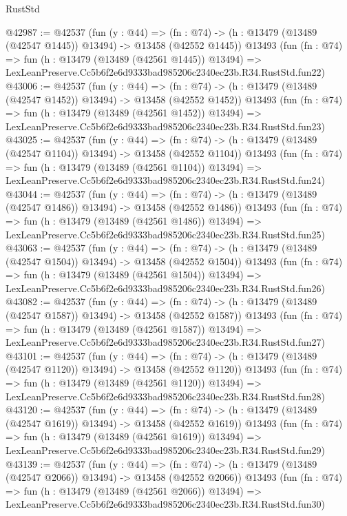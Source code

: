 \begin{lexlean}{RustStd}
\begin{coremodule}
@42987 := @42537
    (fun (y : @44) =>
    (fn : @74) -> (h : @13479 (@13489 (@42547 @1445)) @13494) -> @13458 (@42552 @1445))
    @13493
    (fun (fn : @74) =>
    fun (h : @13479 (@13489 (@42561 @1445)) @13494) =>
    LexLeanPreserve.Cc5b6f2e6d9333bad985206c2340ec23b.R34.RustStd.fun22)
@43006 := @42537
    (fun (y : @44) =>
    (fn : @74) -> (h : @13479 (@13489 (@42547 @1452)) @13494) -> @13458 (@42552 @1452))
    @13493
    (fun (fn : @74) =>
    fun (h : @13479 (@13489 (@42561 @1452)) @13494) =>
    LexLeanPreserve.Cc5b6f2e6d9333bad985206c2340ec23b.R34.RustStd.fun23)
@43025 := @42537
    (fun (y : @44) =>
    (fn : @74) -> (h : @13479 (@13489 (@42547 @1104)) @13494) -> @13458 (@42552 @1104))
    @13493
    (fun (fn : @74) =>
    fun (h : @13479 (@13489 (@42561 @1104)) @13494) =>
    LexLeanPreserve.Cc5b6f2e6d9333bad985206c2340ec23b.R34.RustStd.fun24)
@43044 := @42537
    (fun (y : @44) =>
    (fn : @74) -> (h : @13479 (@13489 (@42547 @1486)) @13494) -> @13458 (@42552 @1486))
    @13493
    (fun (fn : @74) =>
    fun (h : @13479 (@13489 (@42561 @1486)) @13494) =>
    LexLeanPreserve.Cc5b6f2e6d9333bad985206c2340ec23b.R34.RustStd.fun25)
@43063 := @42537
    (fun (y : @44) =>
    (fn : @74) -> (h : @13479 (@13489 (@42547 @1504)) @13494) -> @13458 (@42552 @1504))
    @13493
    (fun (fn : @74) =>
    fun (h : @13479 (@13489 (@42561 @1504)) @13494) =>
    LexLeanPreserve.Cc5b6f2e6d9333bad985206c2340ec23b.R34.RustStd.fun26)
@43082 := @42537
    (fun (y : @44) =>
    (fn : @74) -> (h : @13479 (@13489 (@42547 @1587)) @13494) -> @13458 (@42552 @1587))
    @13493
    (fun (fn : @74) =>
    fun (h : @13479 (@13489 (@42561 @1587)) @13494) =>
    LexLeanPreserve.Cc5b6f2e6d9333bad985206c2340ec23b.R34.RustStd.fun27)
@43101 := @42537
    (fun (y : @44) =>
    (fn : @74) -> (h : @13479 (@13489 (@42547 @1120)) @13494) -> @13458 (@42552 @1120))
    @13493
    (fun (fn : @74) =>
    fun (h : @13479 (@13489 (@42561 @1120)) @13494) =>
    LexLeanPreserve.Cc5b6f2e6d9333bad985206c2340ec23b.R34.RustStd.fun28)
@43120 := @42537
    (fun (y : @44) =>
    (fn : @74) -> (h : @13479 (@13489 (@42547 @1619)) @13494) -> @13458 (@42552 @1619))
    @13493
    (fun (fn : @74) =>
    fun (h : @13479 (@13489 (@42561 @1619)) @13494) =>
    LexLeanPreserve.Cc5b6f2e6d9333bad985206c2340ec23b.R34.RustStd.fun29)
@43139 := @42537
    (fun (y : @44) =>
    (fn : @74) -> (h : @13479 (@13489 (@42547 @2066)) @13494) -> @13458 (@42552 @2066))
    @13493
    (fun (fn : @74) =>
    fun (h : @13479 (@13489 (@42561 @2066)) @13494) =>
    LexLeanPreserve.Cc5b6f2e6d9333bad985206c2340ec23b.R34.RustStd.fun30)

\end{coremodule}
\end{lexlean}
